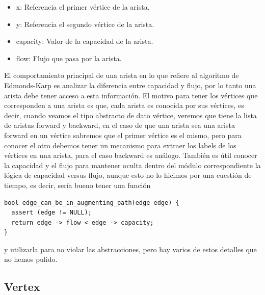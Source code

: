 \documentclass[11pt]{article}
\begin{document}
\begin{itemize}
\item x: Referencia el primer vértice de la arista.
\item y: Referencia el segundo vértice de la arista.
\item capacity: Valor de la capacidad de la arista.
\item flow: Flujo que pasa por la arista.
\end{itemize}
El comportamiento principal de una arista en lo que refiere al
algoritmo de Edmonds-Karp es analizar la diferencia entre capacidad y
flujo, por lo tanto una arista debe tener acceso a esta información.
El motivo para tener los vértices que corresponden a una arista es
que, cada arista es conocida por sus vértices, es decir, cuando
veamos el tipo abstracto de dato vértice, veremos que tiene la lista
de aristas forward y backward, en el caso de que una arista sea una
arista forward en un vértice sabremos que el primer vértice es el
mismo, pero para conocer el otro debemos tener un mecanismo para
extraer los labels de los vértices en una arista, para el caso
backward es análogo. También es útil conocer la capacidad y el flujo
para mantener oculta dentro del módulo correspondiente la lógica de
capacidad versus flujo, aunque esto no lo hicimos por una cuestión de
tiempo, es decir, sería bueno tener una función 

\begin{verbatim}
bool edge_can_be_in_augmenting_path(edge edge) {
  assert (edge != NULL);
  return edge -> flow < edge -> capacity;
}
\end{verbatim}
y utilizarla para no violar las abstracciones, pero hay varios de
estos detalles que no hemos pulido.
\subsection{Vertex}
\label{sec-5-2}
\end{document}
